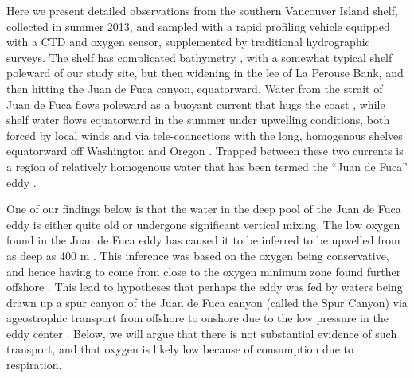 \documentclass[draft]{agujournal2019}
\begin{document}
Here we present detailed observations from the southern Vancouver Island shelf, collected in summer 2013, and sampled with a rapid profiling vehicle equipped with a CTD and oxygen sensor, supplemented by traditional hydrographic surveys. The shelf has complicated bathymetry , with a somewhat typical shelf poleward of our study site, but then widening in the lee of La Perouse Bank, and then hitting the Juan de Fuca canyon, equatorward.  Water from the strait of Juan de Fuca flows poleward as a buoyant current that hugs the coast \cite{thomsonetal89, hickeyetal91}, while shelf water flows equatorward in the summer under upwelling conditions, both forced by local winds and via tele-connections with the long, homogenous shelves equatorward off Washington and Oregon \cite{hickeyetal91,thomsonkrassovski15,engidaetal16}.  Trapped between these two currents is a region of relatively homogenous water that has been termed the ``Juan de Fuca'' eddy \cite{freelanddenman82,freelandmcintosh89,foremanetal07,macfadyenhickey10}.

One of our findings below is that the water in the deep pool of the Juan de Fuca eddy is either  quite old or undergone significant vertical mixing.  The low oxygen found in the Juan de Fuca eddy has caused it to be inferred to be upwelled from as deep as 400 m \cite{freelanddenman82,deweycrawford88}.  This inference was based on the oxygen being conservative, and hence having to come from close to the oxygen minimum zone found further offshore \cite{mackasetal87}.  This lead to hypotheses that perhaps the eddy was fed by waters being drawn up a spur canyon of the Juan de Fuca canyon (called the Spur Canyon) via ageostrophic transport from offshore to onshore due to the low pressure in the eddy center \cite{weaverhsieh87}.  Below, we will argue that there is not substantial evidence of such transport, and that oxygen is likely low because of consumption due to respiration.
\end{document}
